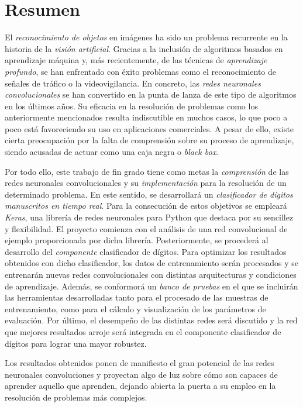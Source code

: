 \chapter*{Resumen}
El \emph{reconocimiento de objetos} en imágenes ha sido un problema recurrente en la historia de la \emph{visión artificial}. Gracias a la inclusión de algoritmos basados en aprendizaje máquina y, más recientemente, de las técnicas de \emph{aprendizaje profundo}, se han enfrentado con éxito problemas como el reconocimiento de señales de tráfico o la videovigilancia. En concreto, las \emph{redes neuronales convolucionales} se han convertido en la punta de lanza de este tipo de algoritmos en los últimos años. Su eficacia en la resolución de problemas como los anteriormente mencionados resulta indiscutible en muchos casos, lo que poco a poco está favoreciendo su uso en aplicaciones comerciales. A pesar de ello, existe cierta preocupación por la falta de comprensión sobre su proceso de aprendizaje, siendo acusadas de actuar como una caja negra o \emph{black box}.

Por todo ello, este trabajo de fin grado tiene como metas la \emph{comprensión} de las redes neuronales convolucionales y su \emph{implementación} para la resolución de un determinado problema. En este sentido, se desarrollará un \emph{clasificador de dígitos manuscritos en tiempo real}. Para la consecución de estos objetivos se empleará \emph{Keras}, una librería de redes neuronales para Python que destaca por su sencillez y flexibilidad. El proyecto comienza con el análisis de una red convolucional de ejemplo proporcionada por dicha librería. Posteriormente, se procederá al desarrollo del \emph{componente} clasificador de dígitos. Para optimizar los resultados obtenidos con dicho clasificador, los datos de entrenamiento serán procesados y se entrenarán nuevas redes convolucionales con distintas arquitecturas y condiciones de aprendizaje. Además, se conformorá un \emph{banco de pruebas} en el que se incluirán las herramientas desarrolladas tanto para el procesado de las muestras de entrenamiento, como para el cálculo y visualización de los parámetros de evaluación. Por último, el desempeño de las distintas redes será discutido y la red que mejores resultados arroje será integrada en el componente clasificador de dígitos para lograr una mayor robustez.

Los resultados obtenidos ponen de manifiesto el gran potencial de las redes neuronales convoluciones y proyectan algo de luz sobre cómo son capaces de aprender aquello que aprenden, dejando abierta la puerta a su empleo en la resolución de problemas más complejos.